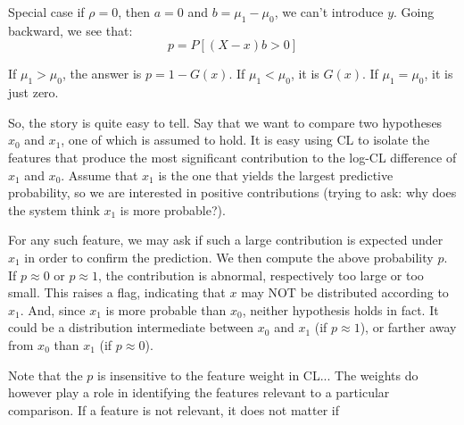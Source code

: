 \documentclass[english]{scrartcl}
\begin{document}
Special case if $\rho=0$, then $a=0$ and $b=\mu_1-\mu_0$, we can't introduce $y$. Going backward, we see that:
$$
p = P[(X-x)b>0]
$$

If $\mu_1>\mu_0$, the answer is $p=1-G(x)$. If $\mu_1<\mu_0$, it is $G(x)$. If $\mu_1=\mu_0$, it is just zero.

So, the story is quite easy to tell. Say that we want to compare two hypotheses $x_0$ and $x_1$, one of which is assumed to hold. It is easy using CL to isolate the features that produce the most significant contribution to the log-CL difference of $x_1$ and $x_0$. Assume that $x_1$ is the one that yields the largest predictive probability, so we are interested in positive contributions (trying to ask: why does the system think $x_1$ is more probable?). 

For any such feature, we may ask if such a large contribution is expected under $x_1$ in order to confirm the prediction. We then compute the above probability $p$. If $p\approx 0$ or $p\approx 1$, the contribution is abnormal, respectively too large or too small. This raises a flag, indicating that $x$ may NOT be distributed according to $x_1$. And, since $x_1$ is more probable than $x_0$, neither hypothesis holds in fact. It could be a distribution intermediate between $x_0$ and $x_1$ (if $p\approx 1$), or farther away from $x_0$ than $x_1$ (if $p\approx 0$).

Note that the $p$ is insensitive to the feature weight in CL... The weights do however play a role in identifying the features relevant to a particular comparison. If a feature is not relevant, it does not matter if 





\end{document}
